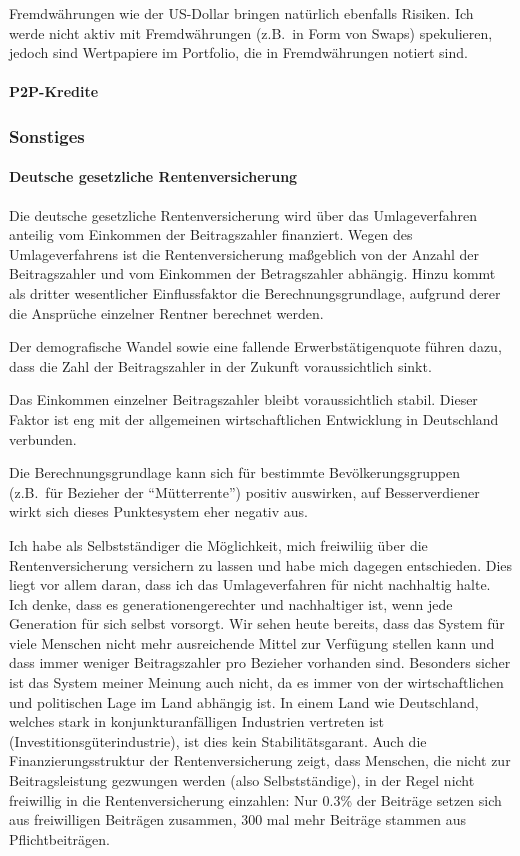 \documentclass{article}
\begin{document}
Fremdwährungen wie der US-Dollar bringen natürlich ebenfalls Risiken. Ich werde nicht aktiv mit Fremdwährungen (z.B.\ in Form von Swaps) spekulieren, jedoch sind Wertpapiere im Portfolio, die in Fremdwährungen notiert sind.

\paragraph{P2P-Kredite}



\subsubsection{Sonstiges}

\paragraph{Deutsche gesetzliche Rentenversicherung}

Die deutsche gesetzliche Rentenversicherung wird über das Umlageverfahren anteilig vom Einkommen der Beitragszahler finanziert. Wegen des Umlageverfahrens ist die Rentenversicherung maßgeblich von der Anzahl der Beitragszahler und vom Einkommen der Betragszahler abhängig. Hinzu kommt als dritter wesentlicher Einflussfaktor die Berechnungsgrundlage, aufgrund derer die Ansprüche einzelner Rentner berechnet werden.

Der demografische Wandel sowie eine fallende Erwerbstätigenquote führen dazu, dass die Zahl der Beitragszahler in der Zukunft voraussichtlich sinkt.

Das Einkommen einzelner Beitragszahler bleibt voraussichtlich stabil. Dieser Faktor ist eng mit der allgemeinen wirtschaftlichen Entwicklung in Deutschland verbunden.

Die Berechnungsgrundlage kann sich für bestimmte Bevölkerungsgruppen (z.B.\ für Bezieher der ``Mütterrente'') positiv auswirken, auf Besserverdiener wirkt sich dieses Punktesystem eher negativ aus.

Ich habe als Selbstständiger die Möglichkeit, mich freiwiliig über die Rentenversicherung versichern zu lassen und habe mich dagegen entschieden. Dies liegt vor allem daran, dass ich das Umlageverfahren für nicht nachhaltig halte. Ich denke, dass es generationengerechter und nachhaltiger ist, wenn jede Generation für sich selbst vorsorgt. Wir sehen heute bereits, dass das System für viele Menschen nicht mehr ausreichende Mittel zur Verfügung stellen kann und dass immer weniger Beitragszahler pro Bezieher vorhanden sind. Besonders sicher ist das System meiner Meinung auch nicht, da es immer von der wirtschaftlichen und politischen Lage im Land abhängig ist. In einem Land wie Deutschland, welches stark in konjunkturanfälligen Industrien vertreten ist (Investitionsgüterindustrie), ist dies kein Stabilitätsgarant. Auch die Finanzierungsstruktur der Rentenversicherung zeigt, dass Menschen, die nicht zur Beitragsleistung gezwungen werden (also Selbstständige), in der Regel nicht freiwillig in die Rentenversicherung einzahlen: Nur 0.3\% der Beiträge setzen sich aus freiwilligen Beiträgen zusammen, 300 mal mehr Beiträge stammen aus Pflichtbeiträgen.
\end{document}
